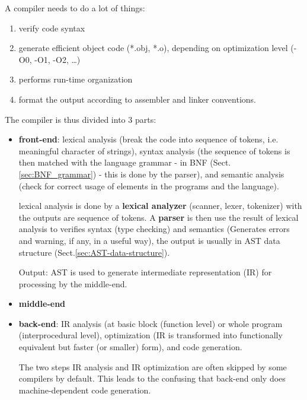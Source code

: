 A compiler needs to do a lot of things:
\begin{enumerate}
  \item verify code syntax
  
  \item generate efficient object code (*.obj, *.o), depending on optimization
  level (-O0, -O1, -O2, \ldots)
  
  \item performs run-time organization
  
  \item format the output according to assembler and linker conventions.
\end{enumerate}
The compiler is thus divided into 3 parts:
\begin{itemize}
  \item {\bf front-end}: lexical analysis (break the code into sequence of
  tokens, i.e. meaningful character of strings), syntax analysis (the sequence of
  tokens is then matched with the language grammar - in BNF
  (Sect.\ref{sec:BNF_grammar}) - this is done by the parser), and semantic
  analysis (check for correct usage of elements in the programs and the language).
  
  lexical analysis is done by a {\bf lexical analyzer} (scanner, lexer,
  tokenizer) with the outputs are sequence of tokens. A {\bf parser} is then use
  the result of lexical analysis to verifies syntax (type checking) and
  semantics (Generates errors and warning, if any, in a useful way), the output is usually in AST data structure
  (Sect.\ref{sec:AST-data-structure}).
  
  
  Output: AST is used to generate intermediate representation (IR) for
  processing by the middle-end.
  
  
  
  \item {\bf middle-end}
  
  \item {\bf back-end}: IR analysis (at basic block (function level) or whole
  program (interprocedural level), optimization (IR is transformed into functionally
  equivalent but faster (or smaller) form), and code generation.
  
  The two steps IR analysis and IR optimization are often skipped by some
  compilers by default. This leads to the confusing that back-end only does
  machine-dependent code generation.
  

\end{itemize}
